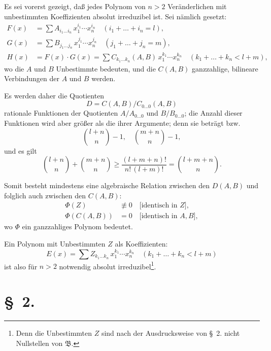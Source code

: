 \documentclass[fontsize=10pt,paper=a5,pagesize,headings=small]{scrbook}
\newcommand{\ideal}[1]{\mathfrak{#1}}
\theoremstyle{plain}
\begin{document}
Es sei vorerst gezeigt, daß jedes Polynom von $n > 2$ Veränderlichen mit
unbestimmten Koeffizienten absolut irreduzibel ist. Sei nämlich gesetzt:
\begin{align}
\label{eq:1a}
F(x) &= \sum A_{i_1\dots i_n}\, x_1^{i_1}\cdots x_n^{i_n} \quad (i_1+\dots+i_n = l),\\
\label{eq:1b}
G(x) &= \sum B_{j_1\dots j_n}\, x_1^{j_1}\cdots x_n^{j_n} \quad (j_1+\dots+j_n = m),\\
\label{eq:1c}
H(x) &= F(x) \cdot G(x) = \sum C_{k_1\dots k_n}(A,B)\, x_1^{k_1}\cdots x_n^{k_n} \quad (k_1+\dots+k_n < l+m),
\end{align}
wo die $A$ und $B$ Unbestimmte bedeuten, und die $C(A,B)$ ganzzahlige,
bilineare Verbindungen der $A$ und $B$ werden.

Es werden daher die Quotienten
\[ D = C(A,B)/C_{0\dots0}(A,B) \]
rationale Funktionen der Quotienten $A/A_{0\dots0}$ und $B/B_{0\dots0}$; die Anzahl
dieser Funktionen wird aber größer als die ihrer Argumente; denn sie beträgt
bzw.
\[ \binom{l+n}{n} - 1,\quad \binom{m+n}{n} - 1, \]
und es gilt
\[ \binom{l+n}{n} + \binom{m+n}{n} \geq \frac{(l+m+n)!}{n!\,(l+m)!} = \binom{l+m+n}{n}. \]

Somit besteht mindestens eine algebraische Relation zwischen den $D(A,B)$
und folglich auch zwischen den $C(A,B)$:
\begin{equation}
\label{eq:2}
\begin{aligned}
\varPhi(Z) &\not\equiv 0 \quad \text{[identisch in $Z$]},\\
\varPhi(C(A,B)) &= 0 \quad \text{[identisch in $A,B$]},
\end{aligned}
\end{equation}
wo $\varPhi$ ein ganzzahliges Polynom bedeutet.

Ein Polynom mit Unbestimmten $Z$ als Koeffizienten:
\begin{equation}
\label{eq:3}
E(x) = \sum Z_{k_1\dots k_n}\, x_1^{k_1}\cdots x_n^{k_n} \quad (k_1+\dots+k_n < l+m)
\end{equation}
ist also für $n > 2$ notwendig absolut irreduzibel\footnote{Denn die Unbestimmten $Z$
sind nach der Ausdrucksweise von \S~2. nicht Nullstellen von $\ideal{B}$.}.

\section*{\S~2.}
\setcounter{section}{2}
\end{document}
